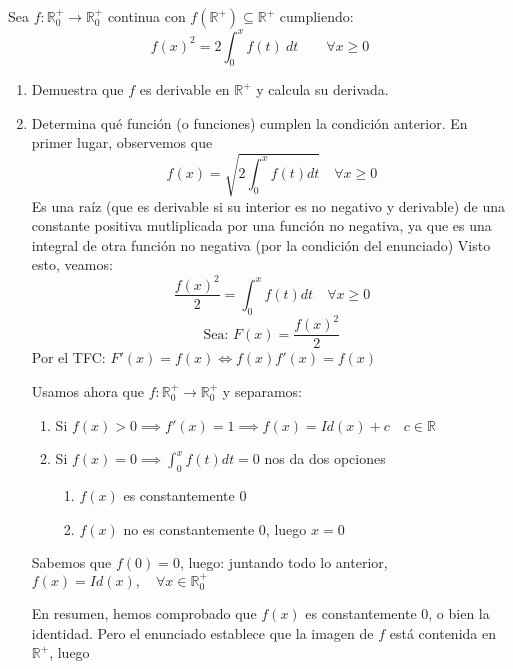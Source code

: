 \documentclass[12pt]{article}
\begin{document}
    \begin{ejercicio}
        Sea $f:\mathbb{R}^+_0\longrightarrow\mathbb{R}^+_0$ continua con $f(\mathbb{R}^+) \subseteq \mathbb{R}^+$ cumpliendo:
        \begin{equation*}
            f(x)^2 = 2\int_{0}^{x} f(t)~dt \qquad \forall x\geq 0
        \end{equation*}
        \begin{enumerate}[label=\alph*)]
            \item Demuestra que $f$ es derivable en $\mathbb{R}^+$ y calcula su derivada.
            \item Determina qué función (o funciones) cumplen la condición anterior.
            En primer lugar, observemos que $$f(x) = \sqrt{2\int_0^xf(t)dt} \quad \forall x \geq0$$
            Es una raíz (que es derivable si su interior es no negativo y derivable) de una constante positiva mutliplicada por una función no negativa, ya que es una integral de otra función no negativa (por la condición del enunciado)
            Visto esto, veamos:
            $$\frac{f(x)^2}{2} = \int_0^xf(t)dt \quad \forall x \geq0 $$ $$\text{Sea: } F(x)= \frac{f(x)^2}{2}$$
            Por el TFC: $F'(x) = f(x) \iff f(x) f'(x) = f(x)$
            
            Usamos ahora que $f:\mathbb{R}^+_0\longrightarrow\mathbb{R}^+_0$ y separamos:
            \begin{enumerate}
                \item Si $f(x) > 0 \implies f'(x) = 1 \implies f(x) = Id(x)+c \quad c\in \mathbb{R}$
                \item Si $f(x) = 0 \implies \int_0^xf(t)dt = 0$ nos da dos opciones \begin{enumerate}
                    \item $f(x)$ es constantemente 0
                    \item $f(x)$ no es constantemente 0, luego $x=0$
                \end{enumerate}
                
            \end{enumerate}
             Sabemos que $f(0) = 0 $, luego:
            \newline juntando todo lo anterior, $f(x) = Id(x), \quad  \forall x \in \mathbb{R}_0^+$

            En resumen, hemos comprobado que $f(x)$ es constantemente $0$, o bien la identidad. Pero el enunciado establece que la imagen de $f$ está contenida en $\mathbb{R}^+$, luego 
            

        \end{enumerate}
    \end{ejercicio}
\end{document}
